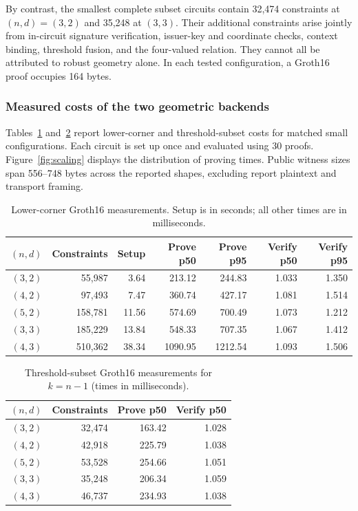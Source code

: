 By contrast, the smallest complete subset circuits contain 32,474 constraints at $(n,d)=(3,2)$ and 35,248 at $(3,3)$. Their additional constraints arise jointly from in-circuit signature verification, issuer-key and coordinate checks, context binding, threshold fusion, and the four-valued relation. They cannot all be attributed to robust geometry alone. In each tested configuration, a Groth16 proof occupies 164 bytes.

\subsubsection{Measured costs of the two geometric backends}
Tables~\ref{tab:crypto} and~\ref{tab:subset} report lower-corner and threshold-subset costs for matched small configurations. Each circuit is set up once and evaluated using 30 proofs. Figure~\ref{fig:scaling} displays the distribution of proving times. Public witness sizes span 556--748 bytes across the reported shapes, excluding report plaintext and transport framing.

\begin{table}[htbp]\centering\small
\caption{Lower-corner Groth16 measurements. Setup is in seconds; all other times are in milliseconds.}\label{tab:crypto}
\begin{tabular}{rrrrrrr}\toprule
$(n,d)$&Constraints&Setup&Prove p50&Prove p95&Verify p50&Verify p95\\\midrule
$(3,2)$&55,987&3.64&213.12&244.83&1.033&1.350\\
$(4,2)$&97,493&7.47&360.74&427.17&1.081&1.514\\
$(5,2)$&158,781&11.56&574.69&700.49&1.073&1.212\\
$(3,3)$&185,229&13.84&548.33&707.35&1.067&1.412\\
$(4,3)$&510,362&38.34&1090.95&1212.54&1.093&1.506\\\bottomrule
\end{tabular}
\end{table}

\begin{table}[htbp]\centering\small
\caption{Threshold-subset Groth16 measurements for $k=n-1$ (times in milliseconds).}\label{tab:subset}
\begin{tabular}{rrrr}\toprule
$(n,d)$&Constraints&Prove p50&Verify p50\\\midrule
$(3,2)$&32,474&163.42&1.028\\
$(4,2)$&42,918&225.79&1.038\\
$(5,2)$&53,528&254.66&1.051\\
$(3,3)$&35,248&206.34&1.059\\
$(4,3)$&46,737&234.93&1.038\\\bottomrule
\end{tabular}
\end{table}

